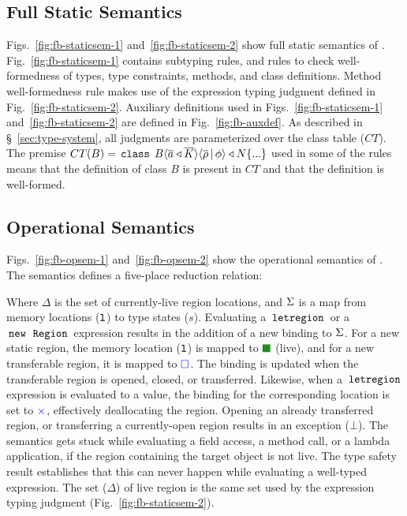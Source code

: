 \subsection{Full Static Semantics}




Figs.~\ref{fig:fb-staticsem-1} and~\ref{fig:fb-staticsem-2} show full
static semantics of \FB. Fig.~\ref{fig:fb-staticsem-1} contains subtyping
rules, and rules to check well-formedness of \FB types, type
constraints, methods, and class definitions. Method well-formedness
rule makes use of the expression typing judgment defined in
Fig.~\ref{fig:fb-staticsem-2}. Auxiliary definitions used in
Figs.~\ref{fig:fb-staticsem-1} and~\ref{fig:fb-staticsem-2} are
defined in Fig.~\ref{fig:fb-auxdef}. As described in
\S~\ref{sec:type-system}, all judgments are parameterized over the
class table ($CT$). The premise $CT(B) = \,{\tt class}\,\; B\langle \overline{a} \triangleleft \overline{K} \rangle\langle \overline{\rho} \,|\, \phi \rangle \triangleleft N\{...\}$
used in some of the rules means that the definition of class $B$ is
present in $CT$ and that the definition is well-formed.

\subsection{Operational Semantics}


Figs.~\ref{fig:fb-opsem-1} and~\ref{fig:fb-opsem-2} show the
operational semantics of \fbname. The semantics defines a five-place
reduction relation:
\begin{smathpar}
\end{smathpar}
Where $\Delta$ is the set of currently-live region locations, and
$\Sigma$ is a map from memory locations ($\mathtt{l}$) to type states ($s$).
Evaluating a $\,{\tt letregion}\,$ or a $\,{\tt new}\,\;\,{\tt Region}\,$ expression
results in the addition of a new binding to $\Sigma$. For a new static
region, the memory location ($\mathtt{l}$) is mapped to $\LIVE$ (live), and
for a new transferable region, it is mapped to ${\color{blue} \square}$. The binding is
updated when the transferable region is opened, closed, or
transferred. Likewise, when a $\,{\tt letregion}\,$ expression is evaluated
to a value, the binding for the corresponding location is set to
${\color{blue}\times}$, effectively deallocating the region. Opening an already
transferred region, or transferring a currently-open region results in
an exception ($\bot$). The semantics gets stuck while evaluating a
field access, a method call, or a lambda application, if the region
containing the target object is not live. The type safety result
establishes that this can never happen while evaluating a well-typed
expression. The set ($\Delta$) of live region is the same set used by
the expression typing judgment (Fig.~\ref{fig:fb-staticsem-2}). 
